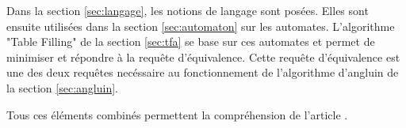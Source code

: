 Dans la section \ref{sec:langage}, les notions de langage sont posées. Elles sont ensuite utilisées dans la section \ref{sec:automaton} sur les automates. L'algorithme "Table Filling" de la section \ref{sec:tfa} se base sur ces automates et permet de minimiser et répondre à la requête d'équivalence. Cette requête d'équivalence est une des deux requêtes necéssaire au fonctionnement de l'algorithme d'angluin de la section \ref{sec:angluin}.

Tous ces éléments combinés permettent la compréhension de l'article \cite{Vardhan04}.
